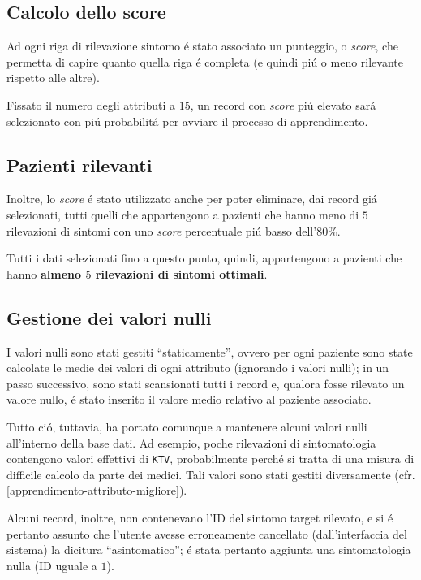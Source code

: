 \documentclass[preprint]{acm_proc_article-sp}
\begin{document}
\subsection{Calcolo dello score}
Ad ogni riga di rilevazione sintomo \'e stato associato un punteggio, o \textit{score}, che permetta di capire quanto quella riga \'e completa (e quindi pi\'u o meno rilevante rispetto alle altre).

Fissato il numero degli attributi a $15$, un record con \textit{score} pi\'u elevato sar\'a selezionato con pi\'u probabilit\'a per avviare il processo di apprendimento.

\subsection{Pazienti rilevanti}
Inoltre, lo \textit{score} \'e stato utilizzato anche per poter eliminare, dai record gi\'a selezionati, tutti quelli che appartengono a pazienti che hanno meno di $5$ rilevazioni di sintomi con uno \textit{score} percentuale pi\'u basso dell'$80\%$.

Tutti i dati selezionati fino a questo punto, quindi, appartengono a pazienti che hanno \textbf{almeno $5$ rilevazioni di sintomi ottimali}.

\subsection{Gestione dei valori nulli}
I valori nulli sono stati gestiti ``staticamente'', ovvero per ogni paziente sono state calcolate le medie dei valori di ogni attributo (ignorando i valori nulli); in un passo successivo, sono stati scansionati tutti i record e, qualora fosse rilevato un valore nullo, \'e stato inserito il valore medio relativo al paziente associato.

Tutto ci\'o, tuttavia, ha portato comunque a mantenere alcuni valori nulli all'interno della base dati. Ad esempio, poche rilevazioni di sintomatologia contengono valori effettivi di \verb|KTV|, probabilmente perch\'e si tratta di una misura di difficile calcolo da parte dei medici. Tali valori sono stati gestiti diversamente (cfr. \ref{apprendimento-attributo-migliore}).

Alcuni record, inoltre, non contenevano l'ID del sintomo target rilevato, e si \'e pertanto assunto che l'utente avesse erroneamente cancellato (dall'interfaccia del sistema) la dicitura ``asintomatico''; \'e stata pertanto aggiunta una sintomatologia nulla (ID uguale a $1$).
\end{document}
